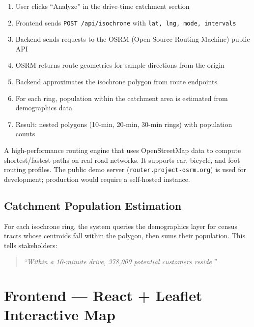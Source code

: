 \documentclass[12pt, a4paper]{article}
\begin{document}
\begin{enumerate}[leftmargin=2em]
    \item User clicks ``Analyze'' in the drive-time catchment section
    \item Frontend sends \texttt{POST /api/isochrone} with \texttt{lat, lng, mode, intervals}
    \item Backend sends requests to the OSRM (Open Source Routing Machine) public API
    \item OSRM returns route geometries for sample directions from the origin
    \item Backend approximates the isochrone polygon from route endpoints
    \item For each ring, population within the catchment area is estimated from demographics data
    \item Result: nested polygons (10-min, 20-min, 30-min rings) with population counts
\end{enumerate}

\begin{conceptbox}
    A high-performance routing engine that uses OpenStreetMap data to compute
    shortest/fastest paths on real road networks. It supports car, bicycle, and
    foot routing profiles. The public demo server (\texttt{router.project-osrm.org})
    is used for development; production would require a self-hosted instance.
\end{conceptbox}

\subsection{Catchment Population Estimation}

For each isochrone ring, the system queries the demographics layer for census tracts
whose centroids fall within the polygon, then sums their population. This tells
stakeholders:

\begin{quote}
    \textit{``Within a 10-minute drive, 378,000 potential customers reside.''}
\end{quote}

\newpage

\section{Frontend — React + Leaflet Interactive Map}
\end{document}
